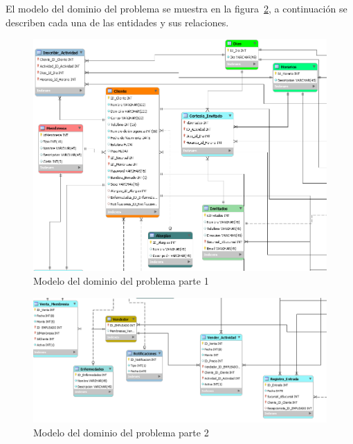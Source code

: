 	El modelo del dominio del problema se muestra en la figura~\ref{fig:modeloDeDominio}, a continuación se describen cada una de las entidades y sus relaciones.
	
\begin{figure}[htbp!]
	\begin{center}
		\includegraphics[angle=90,width=.95\textwidth]{images/BD/bd1}
		\caption{Modelo del dominio del problema parte 1}
		\label{fig:modeloDeDominio}
	\end{center}
\end{figure}

\begin{figure}[htbp!]
	\begin{center}
		\includegraphics[angle=90,width=.5\textwidth]{images/BD/bd2}
		\caption{Modelo del dominio del problema parte 2}
		\label{fig:modeloDeDominio}
	\end{center}
\end{figure}

